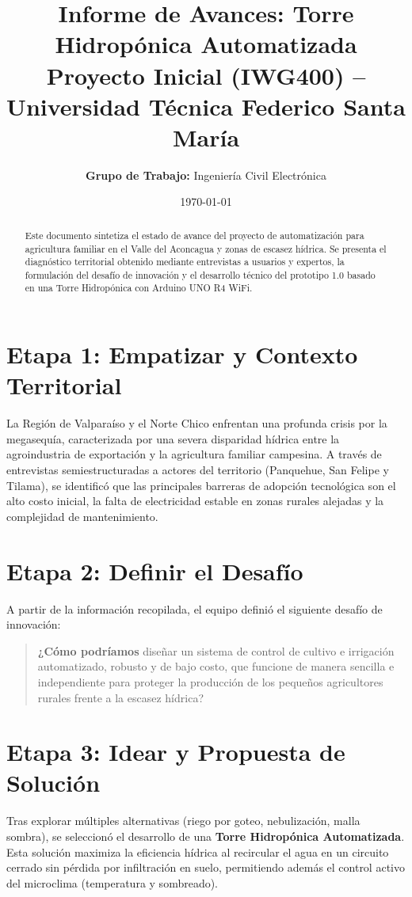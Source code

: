 \documentclass[11pt,a4paper]{article}
\title{\textbf{Informe de Avances: Torre Hidropónica Automatizada}\\
\large Proyecto Inicial (IWG400) -- Universidad Técnica Federico Santa María}
\author{\textbf{Grupo de Trabajo:} Ingeniería Civil Electrónica}
\date{\today}
\begin{document}
\maketitle

\begin{abstract}
Este documento sintetiza el estado de avance del proyecto de automatización para agricultura familiar en el Valle del Aconcagua y zonas de escasez hídrica. Se presenta el diagnóstico territorial obtenido mediante entrevistas a usuarios y expertos, la formulación del desafío de innovación y el desarrollo técnico del prototipo 1.0 basado en una Torre Hidropónica con Arduino UNO R4 WiFi.
\end{abstract}

\section{Etapa 1: Empatizar y Contexto Territorial}
La Región de Valparaíso y el Norte Chico enfrentan una profunda crisis por la megasequía, caracterizada por una severa disparidad hídrica entre la agroindustria de exportación y la agricultura familiar campesina. A través de entrevistas semiestructuradas a actores del territorio (Panquehue, San Felipe y Tilama), se identificó que las principales barreras de adopción tecnológica son el alto costo inicial, la falta de electricidad estable en zonas rurales alejadas y la complejidad de mantenimiento.

\section{Etapa 2: Definir el Desafío}
A partir de la información recopilada, el equipo definió el siguiente desafío de innovación:
\begin{quote}
\textbf{¿Cómo podríamos} diseñar un sistema de control de cultivo e irrigación automatizado, robusto y de bajo costo, que funcione de manera sencilla e independiente para proteger la producción de los pequeños agricultores rurales frente a la escasez hídrica?
\end{quote}

\section{Etapa 3: Idear y Propuesta de Solución}
Tras explorar múltiples alternativas (riego por goteo, nebulización, malla sombra), se seleccionó el desarrollo de una \textbf{Torre Hidropónica Automatizada}. Esta solución maximiza la eficiencia hídrica al recircular el agua en un circuito cerrado sin pérdida por infiltración en suelo, permitiendo además el control activo del microclima (temperatura y sombreado).
\end{document}
